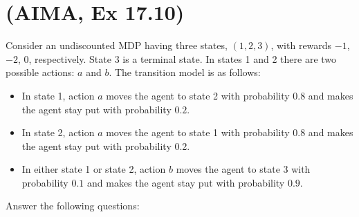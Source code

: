 \documentclass[11pt, a4paper]{article}
\begin{document}

\newpage

\section{(AIMA, Ex 17.10)}

Consider an undiscounted MDP having three states, $(1, 2, 3)$, with rewards $-1$, $-2$, $0$, respectively. State 3 is a terminal state. In
states 1 and 2 there are two possible actions: $a$ and $b$. The transition model is as follows:

\begin{itemize}
    \item In state 1, action $a$ moves the agent to state 2 with probability $0.8$ and makes the agent stay put with probability $0.2$.
    \item In state 2, action $a$ moves the agent to state 1 with probability $0.8$ and makes the agent stay put with probability 0.2.
    \item In either state 1 or state 2, action $b$ moves the agent to state 3 with probability $0.1$ and makes the agent stay put with probability $0.9$.
\end{itemize}

Answer the following questions:
\end{document}
